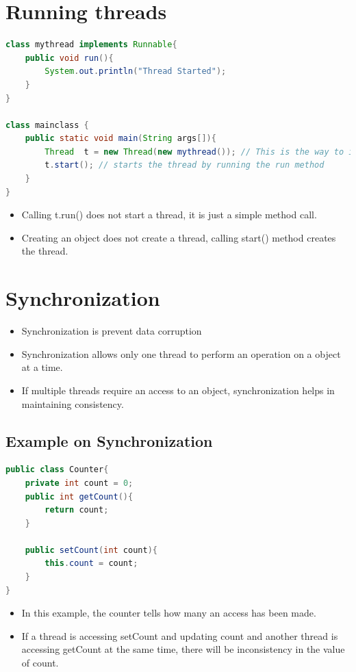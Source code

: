 \documentclass[12pt, a4paper]{book}
\begin{document}
\section{Running threads}
\begin{lstlisting}[language=java]
class mythread implements Runnable{
    public void run(){
        System.out.println("Thread Started");
    }
}

class mainclass {
    public static void main(String args[]){
        Thread  t = new Thread(new mythread()); // This is the way to instantiate a 					 thread implementing runnable interface
        t.start(); // starts the thread by running the run method
    }
}
\end{lstlisting}
\begin{itemize}
    \item Calling t.run() does not start a thread, it is just a simple method call.
    \item Creating an object does not create a thread, calling start() method creates the thread.
\end{itemize}

\section{Synchronization}
\begin{itemize}
    \item Synchronization is prevent data corruption
    \item Synchronization allows only one thread to perform an operation on a object at a time.
    \item If multiple threads require an access to an object, synchronization helps in maintaining consistency.
\end{itemize}
\subsection{Example on Synchronization}
\begin{lstlisting}[language=java]
public class Counter{
    private int count = 0;
    public int getCount(){
        return count;
    }

    public setCount(int count){
        this.count = count;
    }
}
\end{lstlisting}
\begin{itemize}
    \item In this example, the counter tells how many an access has been made.
    \item If a thread is accessing setCount and updating count and another thread is accessing getCount at the same time, there will be inconsistency in the value of count.
\end{itemize}
\end{document}
